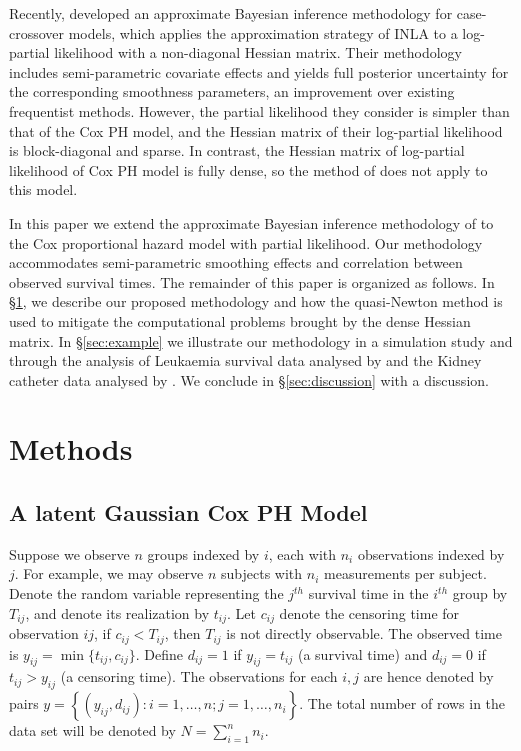 \documentclass[ba]{imsart}
\begin{document}
Recently, \cite{casecross} developed an approximate Bayesian inference methodology for case-crossover models, which applies the approximation strategy of INLA to a log-partial likelihood with a non-diagonal Hessian matrix. Their methodology includes semi-parametric covariate effects and yields full posterior uncertainty for the corresponding smoothness parameters, an improvement over existing frequentist methods. However, the partial likelihood they consider is simpler than that of the Cox PH model, and the Hessian matrix of their log-partial likelihood is block-diagonal and sparse. In contrast, the Hessian matrix of log-partial likelihood of Cox PH model is fully dense, so the method of \cite{casecross} does not apply to this model.

In this paper we extend the approximate Bayesian inference methodology of \cite{casecross} to the Cox proportional hazard model with partial likelihood. Our methodology accommodates semi-parametric smoothing effects and correlation between observed survival times. The remainder of this paper is organized as follows. In \S\ref{sec:method}, we describe our proposed methodology and how the quasi-Newton method is used to mitigate the computational problems brought by the dense Hessian matrix. In \S\ref{sec:example} we illustrate our methodology in a simulation study and through the analysis of Leukaemia survival data analysed by \cite{inlacoxph} and the Kidney catheter data analysed by \cite{kidney}. We conclude in \S\ref{sec:discussion} with a discussion.

\section{Methods}\label{sec:method}

\subsection{A latent Gaussian Cox PH Model}

Suppose we observe $n$ groups indexed by $i$, each with $n_{i}$ observations indexed by $j$. For example, we may observe $n$ subjects with $n_{i}$ measurements per subject. Denote the random variable representing the $j^{th}$ survival time in the $i^{th}$ group by $T_{ij}$, and denote its realization by $t_{ij}$. Let $c_{ij}$ denote the censoring time for observation $ij$, if $c_{ij} < T_{ij}$, then $T_{ij}$ is not directly observable. The observed time is $y_{ij} = \min\{t_{ij},c_{ij}\}$. Define $d_{ij} = 1$ if $y_{ij} = t_{ij}$ (a survival time) and $d_{ij} = 0$ if $t_{ij} > y_{ij}$ (a censoring time). The observations for each $i,j$ are hence denoted by pairs $y =  \left\{(y_{ij},d_{ij}): i = 1,\ldots,n; j = 1,\ldots,n_{i} \right\}$. The total number of rows in the data set will be denoted by $N = \sum_{i=1}^{n}n_{i}$.
\end{document}
